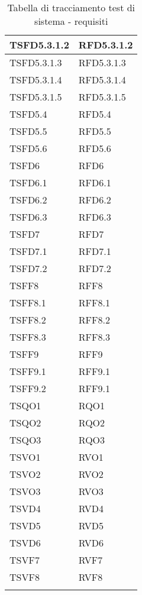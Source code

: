 \begin{center}
\begin{longtable}{ | >{\centering\arraybackslash}m{5cm} | >{\centering\arraybackslash}m{5cm} | }
				TSFD5.3.1.2 & RFD5.3.1.2 \\ \hline
				TSFD5.3.1.3 & RFD5.3.1.3 \\ \hline
				TSFD5.3.1.4 & RFD5.3.1.4 \\ \hline
				TSFD5.3.1.5 & RFD5.3.1.5 \\ \hline
				TSFD5.4 & RFD5.4 \\ \hline
				TSFD5.5 & RFD5.5 \\ \hline
				TSFD5.6 & RFD5.6 \\ \hline
				TSFD6 & RFD6 \\ \hline
				TSFD6.1 & RFD6.1 \\ \hline
				TSFD6.2 & RFD6.2 \\ \hline
				TSFD6.3 & RFD6.3 \\ \hline
				TSFD7 & RFD7 \\ \hline
				TSFD7.1 & RFD7.1 \\ \hline
				TSFD7.2 & RFD7.2 \\ \hline
				TSFF8 & RFF8 \\ \hline
				TSFF8.1 & RFF8.1 \\ \hline
				TSFF8.2 & RFF8.2 \\ \hline
				TSFF8.3 & RFF8.3 \\ \hline
				TSFF9 & RFF9 \\ \hline
				TSFF9.1 & RFF9.1 \\ \hline
				TSFF9.2 & RFF9.1 \\ \hline
				TSQO1 & RQO1 \\ \hline
				TSQO2 & RQO2 \\ \hline
				TSQO3 & RQO3 \\ \hline
				TSVO1 & RVO1 \\ \hline
				TSVO2 & RVO2 \\ \hline
				TSVO3 & RVO3 \\ \hline
				TSVD4 & RVD4 \\ \hline
				TSVD5 & RVD5 \\ \hline
				TSVD6 & RVD6 \\ \hline
				TSVF7 & RVF7 \\ \hline
				TSVF8 & RVF8 \\ \hline
			\caption[Tracciamento test di sistema - requisiti]{Tabella di tracciamento test di sistema - requisiti}
			\end{longtable}
	
			\end{center}
